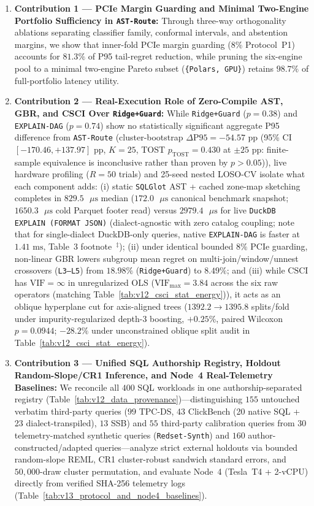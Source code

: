 \documentclass[10pt,a4paper]{article}
\begin{document}
\begin{enumerate}
    \item \textbf{Contribution 1 --- PCIe Margin Guarding and Minimal Two-Engine Portfolio Sufficiency in \texttt{AST-Route}:} Through three-way orthogonality ablations separating classifier family, conformal intervals, and abstention margins, we show that inner-fold PCIe margin guarding ($8\%$ Protocol~P1) accounts for $81.3\%$ of P95 tail-regret reduction, while pruning the six-engine pool to a minimal two-engine Pareto subset (\texttt{\{Polars, GPU\}}) retains $98.7\%$ of full-portfolio latency utility.
    \item \textbf{Contribution 2 --- Real-Execution Role of Zero-Compile AST, GBR, and CSCI Over \texttt{Ridge+Guard}:} While \texttt{Ridge+Guard} ($p=0.38$) and \texttt{EXPLAIN-DAG} ($p=0.74$) show no statistically significant aggregate P95 difference from \texttt{AST-Route} (cluster-bootstrap $\Delta\text{P95} = -54.57\text{ pp}$ (95\% CI $[-170.46, +137.97]\text{ pp}$, $K=25$, TOST $p_{\text{TOST}} = 0.430$ at $\pm 25\text{ pp}$: finite-sample equivalence is inconclusive rather than proven by $p>0.05$)), live hardware profiling ($R=50$ trials) and 25-seed nested LOSO-CV isolate what each component adds: (i) static \texttt{SQLGlot} AST + cached zone-map sketching completes in $829.5\text{ }\mu\text{s}$ median ($172.0\text{ }\mu\text{s}$ canonical benchmark snapshot; $1650.3\text{ }\mu\text{s}$ cold Parquet footer read) versus $2979.4\text{ }\mu\text{s}$ for live \texttt{DuckDB EXPLAIN (FORMAT JSON)} (dialect-agnostic with zero catalog coupling; note that for single-dialect DuckDB-only queries, native \texttt{EXPLAIN-DAG} is faster at $1.41\text{ ms}$, Table~3 footnote~$^\ddagger$); (ii) under identical bounded $8\%$ PCIe guarding, non-linear GBR lowers subgroup mean regret on multi-join/window/unnest crossovers (\texttt{L3--L5}) from $18.98\%$ (\texttt{Ridge+Guard}) to $8.49\%$; and (iii) while $\text{CSCI}$ has $\text{VIF}=\infty$ in unregularized OLS ($\text{VIF}_{\max}=3.84$ across the six raw operators (matching Table~\ref{tab:v12_csci_stat_energy})), it acts as an oblique hyperplane cut for axis-aligned trees ($1392.2 \to 1395.8$ splits/fold under impurity-regularized depth-3 boosting, $+0.25\%$, paired Wilcoxon $p=0.0944$; $-28.2\%$ under unconstrained oblique split audit in Table~\ref{tab:v12_csci_stat_energy}).
    \item \textbf{Contribution 3 --- Unified SQL Authorship Registry, Holdout Random-Slope/CR1 Inference, and Node~4 Real-Telemetry Baselines:} We reconcile all $400$ SQL workloads in one authorship-separated registry (Table~\ref{tab:v12_data_provenance})---distinguishing $155$ untouched verbatim third-party queries ($99$ TPC-DS, 43 ClickBench (20 native SQL + 23 dialect-transpiled), $13$ SSB) and $55$ third-party calibration queries from $30$ telemetry-matched synthetic queries (\texttt{Redset-Synth}) and $160$ author-constructed/adapted queries---analyze strict external holdouts via bounded random-slope REML, CR1 cluster-robust sandwich standard errors, and $50{,}000$-draw cluster permutation, and evaluate Node~4 (Tesla~T4 + 2-vCPU) directly from verified SHA-256 telemetry logs (Table~\ref{tab:v13_protocol_and_node4_baselines}).
\end{enumerate}
\end{document}
